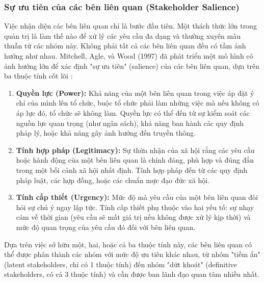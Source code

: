 \documentclass[12pt, a4paper, openany]{report}
\begin{document}

\subsubsection{Sự ưu tiên của các bên liên quan (Stakeholder Salience)}

Việc nhận diện các bên liên quan chỉ là bước đầu tiên. Một thách thức lớn trong quản trị là làm thế nào để xử lý các yêu cầu đa dạng và thường xuyên mâu thuẫn từ các nhóm này. Không phải tất cả các bên liên quan đều có tầm ảnh hưởng như nhau. Mitchell, Agle, và Wood (1997) đã phát triển một mô hình có ảnh hưởng lớn để xác định "sự ưu tiên" (salience) của các bên liên quan, dựa trên ba thuộc tính cốt lõi \cite{Mitchell1997}:

\begin{enumerate}
    \item \textbf{Quyền lực (Power):} Khả năng của một bên liên quan trong việc áp đặt ý chí của mình lên tổ chức, buộc tổ chức phải làm những việc mà nếu không có áp lực đó, tổ chức sẽ không làm. Quyền lực có thể đến từ sự kiểm soát các nguồn lực quan trọng (như ngân sách), khả năng ban hành các quy định pháp lý, hoặc khả năng gây ảnh hưởng đến truyền thông.
    \item \textbf{Tính hợp pháp (Legitimacy):} Sự thừa nhận của xã hội rằng các yêu cầu hoặc hành động của một bên liên quan là chính đáng, phù hợp và đúng đắn trong một bối cảnh xã hội nhất định. Tính hợp pháp đến từ các quy định pháp luật, các hợp đồng, hoặc các chuẩn mực đạo đức xã hội.
    \item \textbf{Tính cấp thiết (Urgency):} Mức độ mà yêu cầu của một bên liên quan đòi hỏi sự chú ý ngay lập tức. Tính cấp thiết phụ thuộc vào hai yếu tố: sự nhạy cảm về thời gian (yêu cầu sẽ mất giá trị nếu không được xử lý kịp thời) và mức độ quan trọng của yêu cầu đó đối với bên liên quan.
\end{enumerate}

Dựa trên việc sở hữu một, hai, hoặc cả ba thuộc tính này, các bên liên quan có thể được phân thành các nhóm với mức độ ưu tiên khác nhau, từ nhóm "tiềm ẩn" (latent stakeholders, chỉ có 1 thuộc tính) đến nhóm "dứt khoát" (definitive stakeholders, có cả 3 thuộc tính) và cần được ban lãnh đạo quan tâm nhiều nhất.
\end{document}
